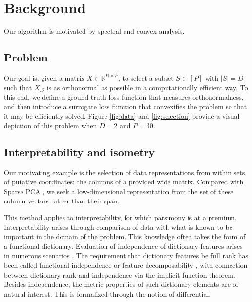 \section{Background}

Our algorithm is motivated by spectral and convex analysis.

\subsection{Problem}

Our goal is, given a matrix $ X \in \mathbb R^{D \times P}$, to select a subset $ S \subset [P]$ with $| S| = D$ such that $X_{.  S}$ is as orthonormal as possible in a computationally efficient way.
To this end, we define a ground truth loss function that measures orthonormalness, and then introduce a surrogate loss function that convexifies the problem so that it may be efficiently solved.
Figure \ref{fig:data} and \ref{fig:selection} provide a visual depiction of this problem when $D=2$ and $P=30$.

\subsection{Interpretability and isometry}

Our motivating example is the selection of data representations from within sets of putative coordinates: the columns of a provided wide matrix.
Compared with Sparse PCA \citep{DAspremont2007-aq, Dey2017-mx, Bertsimas2022-qo, Bertsimas2022-dv}, we seek a low-dimensional representation from the set of these column vectors rather than their span.

This method applies to interpretability, for which parsimony is at a premium.
Interpretability arises through comparison of data with what is known to be important in the domain of the problem.
This knowledge often takes the form of a functional dictionary.
Evaluation of independence of dictionary features arises in numerous scenarios \citep{Chen2019-km, Koelle2022-ju, He2023-ch}.
The requirement that dictionary features be full rank has been called functional independence \citep{Koelle2022-ju} or feature decomposability \citep{templeton2024scaling}, with connection between dictionary rank and independence via the implicit function theorem.
Besides independence, the metric properties of such dictionary elements are of natural interest.
This is formalized through the notion of differential.

